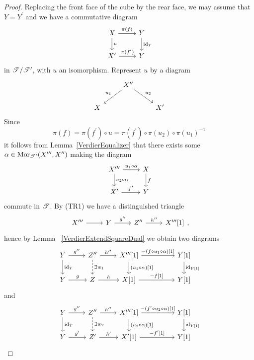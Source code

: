 \documentclass[dissertation.tex]{subfiles}
\begin{document}
\begin{lem}
\begin{proof}
    Replacing the front face of the cube by the rear face, we may assume that $Y = Y^\prime$ and we have a commutative diagram
    $$\begin{tikzcd}
      X \arrow{r}{\pi(f)}\arrow{d}{u} & Y\arrow{d}{\id_Y}\\
      X^\prime \arrow{r}{\pi(f^\prime)} & Y
    \end{tikzcd}$$
    in $\T/\T^\prime$, with $u$ an isomorphism.
    Represent $u$ by a diagram
    $$\begin{tikzcd}
      & X^{\prime\prime}\arrow[swap]{ld}{u_1}\arrow{rd}{u_2}\\
      X & & X^\prime
    \end{tikzcd}$$
    Since 
    $$\pi(f) = \pi(f^\prime) \circ u = \pi(f^\prime) \circ \pi(u_2) \circ \pi(u_1)^{-1}$$
    it follows from Lemma~\ref{VerdierEqualizer} that there exists some $\alpha \in \Mor{\T^\prime}(X^{\prime\prime\prime},X^{\prime\prime})$ making the diagram
    $$\begin{tikzcd}
      X^{\prime\prime\prime} \arrow{r}{u_1 \circ \alpha}\arrow{d}{u_2 \circ \alpha} & X\arrow{d}{f}\\
      X^\prime \arrow{r}{f^\prime} & Y
    \end{tikzcd}$$
    commute in $\T$.
    By (TR1) we have a distinguished triangle
    $$\begin{tikzcd}
      X^{\prime\prime\prime} \arrow{r} & Y \arrow{r}{g^{\prime\prime}} & Z^{\prime\prime} \arrow{r}{h^{\prime\prime}} & X^{\prime\prime\prime}[1]
    \end{tikzcd},$$
    hence by Lemma~ \ref{VerdierExtendSquareDual} we obtain two diagrams
    $$\begin{tikzcd}
      Y \arrow{r}{g^{\prime\prime}}\arrow{d}{\id_Y} & Z^{\prime\prime} \arrow{r}{h^{\prime\prime}}\arrow[dashed]{d}{\exists w_1} & X^{\prime\prime\prime}[1]\arrow{d}{(u_1 \circ \alpha)[1]} \arrow{rr}{-(f \circ u_1 \circ \alpha)[1]} & & Y[1]\arrow{d}{\id_{Y[1]}}\\
        Y \arrow{r}{g} & Z \arrow{r}{h} & X[1] \arrow{rr}{-f[1]} & & Y[1]
    \end{tikzcd}$$
    and
    $$\begin{tikzcd}
      Y \arrow{r}{g^{\prime\prime}}\arrow{d}{\id_Y} & Z^{\prime\prime} \arrow{r}{h^{\prime\prime}}\arrow[dashed]{d}{\exists w_2} & X^{\prime\prime\prime}[1] \arrow{rr}{-(f^\prime \circ u_2 \circ \alpha)[1]}\arrow{d}{(u_2 \circ \alpha)[1]} & & Y[1]\arrow{d}{\id_{Y[1]}}\\
      Y \arrow{r}{g^\prime} & Z^\prime \arrow{r}{h^\prime} & X^\prime[1] \arrow{rr}{-f^\prime[1]} & & Y[1]

\end{tikzcd}$$
\end{proof}
\end{lem}
\end{document}
